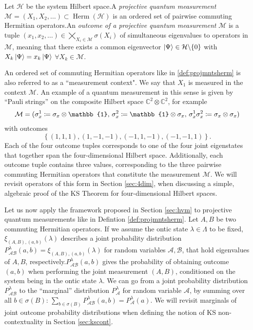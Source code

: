 \begin{definition}
\label{def:projmntsherm}
Let $\mathcal{H}$ be the system Hilbert space.\hfill\break A \emph{projective quantum measurement} $\mathcal{M}=(X_{1},X_{2},\dots)\subset\operatorname{Herm}(\mathcal{H})$ is an ordered set of pairwise commuting Hermitian operators.\hfill\break An \emph{outcome of a projective quantum measurement} $\mathcal{M}$ is a tuple\hfill\break 
$\left(x_{1},x_{2},\dots\right)\in\bigtimes_{X_{i}\in\mathcal{M}}\sigma(X_{i})$ of simultaneous eigenvalues to operators in $\mathcal{M}$, meaning that there exists a common eigenvector $\ket{\Psi} \in\mathcal{H}\backslash\{0\}$ with $X_{k}\ket{\Psi} =x_{k}\ket{\Psi}$  $\forall X_{k}\in\mathcal{M}$.
\end{definition}

An ordered set of commuting Hermitian operators like in \ref{def:projmntsherm} is also referred to as a ``measurement context". We say that $X_1$ is measured in the context $\mathcal{M}$. An example of a quantum measurement in this sense is given by “Pauli strings” on the composite Hilbert space $\mathbb{\mathbb{C}}^{2}\otimes\mathbb{C}^{2}$, for example
\begin{equation*}
\mathcal{M} =(\sigma_{x}^{1} \coloneqq \sigma_{x}\otimes
\mathbb{1},\thinspace\sigma_{x}^{2}\coloneqq\mathbb{1}\otimes\sigma_{x},\thinspace\sigma_{x}^{1}\sigma_{x}^{2}\coloneqq\sigma_{x}\otimes\sigma_{x})
\end{equation*} with outcomes
\begin{equation*}
\left\{ (1,1,1),(1,-1,-1),(-1,1,-1),(-1,-1,1)\right\}.
\end{equation*}
Each of the four outcome tuples corresponds to one of the four joint eigenstates that together span the four-dimensional Hilbert space. Additionally, each outcome tuple contains three values, corresponding to the three pairwise commuting Hermitian operators that constitute the measurement $\mathcal{M}$. We will revisit operators of this form in Section \ref{sec:4dim}, when discussing a simple, algebraic proof of the KS Theorem for four-dimensional Hilbert spaces.

Let us now apply the framework proposed in Section \ref{sec:hvm} to projective quantum measurements like in Defintion \ref{def:projmntsherm}. Let $A,B$ be two commuting Hermitian operators. If we assume the ontic state $\lambda\in\Lambda$ to be fixed, $\xi_{(A,B),(a,b)}(\lambda)$ describes a joint probability distribution $P_{\mathcal{A}\mathcal{B}}^{\lambda}(a,b)=\xi_{(A,B),(a,b)}(\lambda)$ for random variables $\mathcal{A},\mathcal{B}$, that hold eigenvalues of $A,B$, respectively.\hfill\break $P_{\mathcal{A}\mathcal{B}}^{\lambda}(a,b)$ gives the probability of obtaining outcome $(a,b)$ when performing the joint measurement $(A,B)$, conditioned on the system being in the ontic state $\lambda$. We can go from a joint probability distribution $P_{\mathcal{A}\mathcal{B}}^{\lambda}$ to the “marginal” distribution $P_{\mathcal{A}}^{\lambda}$ for random variable $\mathcal{A}$, by summing over all $b\in\sigma(B)$: $\sum_{b\in\sigma(B)}P_{\mathcal{A}\mathcal{B}}^{\lambda}(a,b)=P_{\mathcal{A}}^{\lambda}(a)$. We will revisit marginals of joint outcome probability distributions when defining the notion of KS non-contextuality in Section \ref{sec:kscont}.


